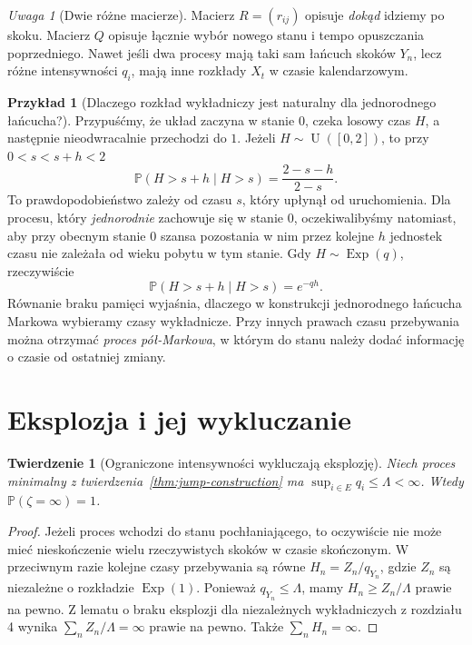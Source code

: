 \documentclass[11pt,a4paper,oneside]{report}
\numberwithin{equation}{chapter}
\theoremstyle{plain}
\newtheorem{twierdzenie}{Twierdzenie}[chapter]
\theoremstyle{definition}
\newtheorem{przyklad}{Przykład}[chapter]
\theoremstyle{remark}
\newtheorem{uwaga}{Uwaga}[chapter]
\newcommand{\Prob}{\mathbb{P}}
\begin{document}
\begin{uwaga}[Dwie różne macierze]
Macierz $R=(r_{ij})$ opisuje \emph{dokąd} idziemy po skoku.
Macierz $Q$ opisuje łącznie wybór nowego stanu i tempo
opuszczania poprzedniego. Nawet jeśli dwa procesy mają taki sam
łańcuch skoków $Y_n$, lecz różne intensywności $q_i$,
mają inne rozkłady $X_t$ w czasie kalendarzowym.
\end{uwaga}


\begin{przyklad}[Dlaczego rozkład wykładniczy jest naturalny dla jednorodnego łańcucha?]
Przypuśćmy, że układ zaczyna w stanie $0$, czeka losowy
czas $H$, a następnie nieodwracalnie przechodzi do $1$.
Jeżeli $H\sim\operatorname{U}([0,2])$, to przy $0<s<s+h<2$
\[
\Prob(H>s+h\mid H>s)=\frac{2-s-h}{2-s}.
\]
To prawdopodobieństwo zależy od czasu $s$, który upłynął
od uruchomienia. Dla procesu, który \emph{jednorodnie}
zachowuje się w stanie $0$, oczekiwalibyśmy natomiast,
aby przy obecnym stanie $0$ szansa pozostania w nim przez
kolejne $h$ jednostek czasu nie zależała od wieku pobytu
w tym stanie. Gdy $H\sim\operatorname{Exp}(q)$, rzeczywiście
\[
\Prob(H>s+h\mid H>s)=e^{-qh}.
\]
Równanie braku pamięci wyjaśnia, dlaczego w konstrukcji
jednorodnego łańcucha Markowa wybieramy czasy wykładnicze.
Przy innych prawach czasu przebywania można otrzymać
\emph{proces pół-Markowa}, w którym do stanu należy
dodać informację o czasie od ostatniej zmiany.
\end{przyklad}

\section{Eksplozja i jej wykluczanie}
\begin{twierdzenie}[Ograniczone intensywności wykluczają eksplozję]
\label{thm:bounded-rates}
Niech proces minimalny z twierdzenia~\ref{thm:jump-construction}
ma $\sup_{i\in E}q_i\le\Lambda<\infty$.
Wtedy $\Prob(\zeta=\infty)=1$.
\end{twierdzenie}
\begin{proof}
Jeżeli proces wchodzi do stanu pochłaniającego, to oczywiście
nie może mieć nieskończenie wielu rzeczywistych skoków
w czasie skończonym. W przeciwnym razie kolejne czasy
przebywania są równe $H_n=Z_n/q_{Y_n}$, gdzie
$Z_n$ są niezależne o rozkładzie $\operatorname{Exp}(1)$.
Ponieważ $q_{Y_n}\le\Lambda$, mamy
$H_n\ge Z_n/\Lambda$ prawie na pewno.
Z lematu o braku eksplozji dla niezależnych wykładniczych
z rozdziału 4 wynika $\sum_n Z_n/\Lambda=\infty$
prawie na pewno. Także $\sum_n H_n=\infty$.
\end{proof}
\end{document}
